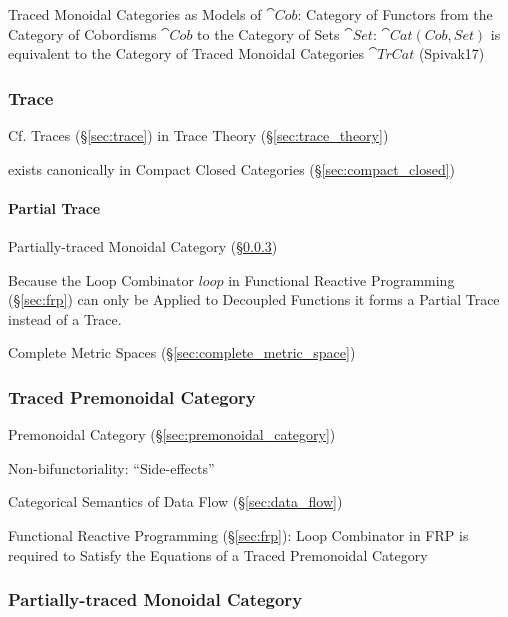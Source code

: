 Traced Monoidal Categories as Models of $\cat{Cob}$: Category of
Functors from the Category of Cobordisms $\cat{Cob}$ to the Category
of Sets $\cat{Set}$: $\cat{Cat(Cob,Set)}$ is equivalent to the
Category of Traced Monoidal Categories $\cat{TrCat}$ (Spivak17)



\subsubsection{Trace}\label{sec:category_trace}

\fist Cf. Traces (\S\ref{sec:trace}) in Trace Theory
(\S\ref{sec:trace_theory})

exists canonically in Compact Closed Categories
(\S\ref{sec:compact_closed}) %



\paragraph{Partial Trace}\label{sec:partial_trace}\hfill

Partially-traced Monoidal Category (\S\ref{sec:partially_traced})

Because the Loop Combinator $loop$ in Functional Reactive Programming
(\S\ref{sec:frp}) can only be Applied to Decoupled Functions it forms
a Partial Trace instead of a Trace.

Complete Metric Spaces (\S\ref{sec:complete_metric_space})



\subsubsection{Traced Premonoidal Category}
\label{sec:traced_premonoidal}

Premonoidal Category (\S\ref{sec:premonoidal_category})

Non-bifunctoriality: ``Side-effects'' \cite{jacobs-heunen-hasuo09}

Categorical Semantics of Data Flow (\S\ref{sec:data_flow})

Functional Reactive Programming (\S\ref{sec:frp}): Loop Combinator in
FRP is required to Satisfy the Equations of a Traced Premonoidal
Category



\subsubsection{Partially-traced Monoidal Category}
\label{sec:partially_traced}

